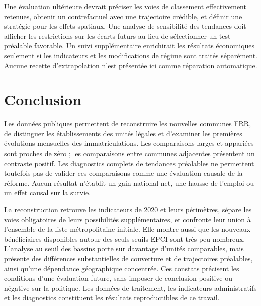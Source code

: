 Une évaluation ultérieure devrait préciser les voies de classement effectivement retenues, obtenir un contrefactuel avec une trajectoire crédible, et définir une stratégie pour les effets spatiaux. Une analyse de sensibilité des tendances doit afficher les restrictions sur les écarts futurs au lieu de sélectionner un test préalable favorable. Un suivi supplémentaire enrichirait les résultats économiques seulement si les indicateurs et les modifications de régime sont traités séparément. Aucune recette d’extrapolation n’est présentée ici comme réparation automatique.

\section{Conclusion}
Les données publiques permettent de reconstruire les nouvelles communes FRR, de distinguer les établissements des unités légales et d’examiner les premières évolutions mensuelles des immatriculations. Les comparaisons larges et appariées sont proches de zéro ; les comparaisons entre communes adjacentes présentent un contraste positif. Les diagnostics complets de tendances préalables ne permettent toutefois pas de valider ces comparaisons comme une évaluation causale de la réforme. Aucun résultat n’établit un gain national net, une hausse de l’emploi ou un effet causal sur la survie.

La reconstruction retrouve les indicateurs de 2020 et leurs périmètres, sépare les voies obligatoires de leurs possibilités supplémentaires, et confronte leur union à l’ensemble de la liste métropolitaine initiale. Elle montre aussi que les nouveaux bénéficiaires disponibles autour des seuls seuils EPCI sont très peu nombreux. L’analyse au seuil des bassins porte sur davantage d’unités comparables, mais présente des différences substantielles de couverture et de trajectoires préalables, ainsi qu’une dépendance géographique concentrée. Ces constats précisent les conditions d’une évaluation future, sans imposer de conclusion positive ou négative sur la politique. Les données de traitement, les indicateurs administratifs et les diagnostics constituent les résultats reproductibles de ce travail.

